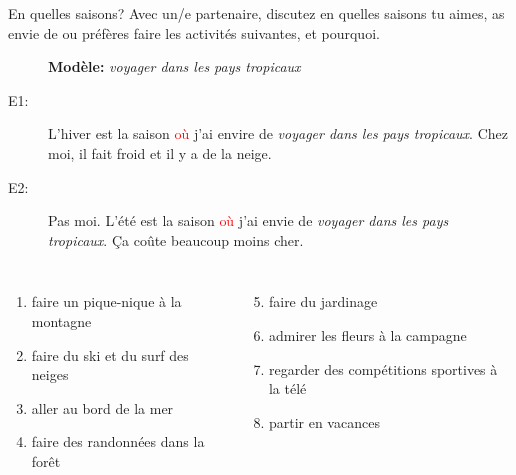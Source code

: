 \documentclass{beamer}
\begin{document}
  \begin{frame}{En quelles saisons?}
    \small
    Avec un/e partenaire, discutez en quelles saisons tu \alert{aimes}, \alert{as envie de} ou \alert{préfères} faire les activités suivantes, et pourquoi.
    \begin{description}
      \item[] \textbf{Modèle:} \textit{voyager dans les pays tropicaux}
      \item[E1:] L'hiver est la saison \textcolor{red}{où} \alert{j'ai envire de} \textit{voyager dans les pays tropicaux}. Chez moi, il fait froid et il y a de la neige.
      \item[E2:] Pas moi. L'été est la saison \textcolor{red}{où} \alert{j'ai envie de} \textit{voyager dans les pays tropicaux}. Ça coûte beaucoup moins cher.
    \end{description}
    \begin{columns}[t]
        \begin{enumerate}
          \item faire un pique-nique à la montagne
          \item faire du ski et du surf des neiges
          \item aller au bord de la mer
          \item faire des randonnées dans la forêt
        \end{enumerate}
        \begin{enumerate}
          \setcounter{enumi}{4}
          \item faire du jardinage
          \item admirer les fleurs à la campagne
          \item regarder des compétitions sportives à la télé
          \item partir en vacances
        \end{enumerate}
    \end{columns}
  \end{frame}
\end{document}
